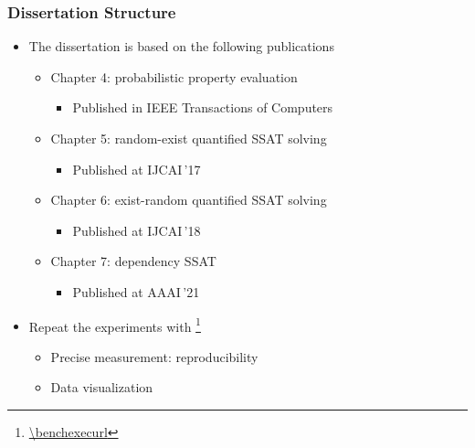 \begin{frame}
      \frametitle{Dissertation Structure}
      \begin{itemize}
            \item The dissertation is based on the following publications
                  \begin{itemize}
                        \item Chapter 4: probabilistic property evaluation
                              \begin{itemize}
                                    \item Published in IEEE Transactions of Computers~\cite{LeeTC18ProbDesign}
                              \end{itemize}
                        \item Chapter 5: random-exist quantified SSAT solving
                              \begin{itemize}
                                    \item Published at IJCAI\,'17~\cite{LeeIJCAI17RESSAT}
                              \end{itemize}
                        \item Chapter 6: exist-random quantified SSAT solving
                              \begin{itemize}
                                    \item Published at IJCAI\,'18~\cite{LeeIJCAI18ERSSAT}
                              \end{itemize}
                        \item Chapter 7: dependency SSAT
                              \begin{itemize}
                                    \item Published at AAAI\,'21~\cite{LeeAAAI21DSSAT}
                              \end{itemize}
                  \end{itemize}
                  \pause
            \item Repeat the experiments with \benchexec\footnote{\url{\benchexecurl}}
                  \begin{itemize}
                        \item Precise measurement: reproducibility
                        \item Data visualization
                  \end{itemize}
      \end{itemize}
\end{frame}